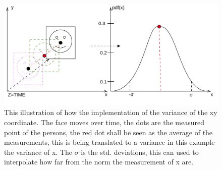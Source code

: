 \begin{figure}[H]
    \centering
    \includegraphics[width=\textwidth]{figures/mark2.png}
    \caption{This illustration of how the implementation of the variance of the xy coordinate. The face moves over time, the dots are the measured point of the persons, the red dot shall be seen as the average of the measurements, this is being translated to a variance in this example the variance of x. The $\sigma$ is the std. deviations, this can used to interpolate how far from the norm the measurement of x are.}
    \label{fig:varMean}
\end{figure}

